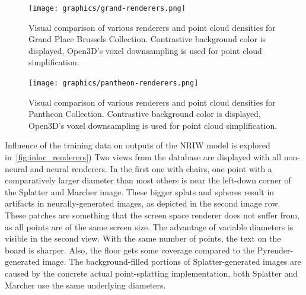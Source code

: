 \begin{figure}
    \centering
    \texttt{[image: graphics/grand-renderers.png]}
    \caption[Visual comparison of various renderers and point cloud
    densities for Grand Place Brussels Collection]{Visual comparison
    of various renderers and point cloud densities for Grand Place Brussels
    Collection. Contrastive background color is displayed, Open3D's
    voxel downsampling is used for point cloud simplification.}
    \label{fig:grand_renderers}
\end{figure}

\begin{figure}
    \centering
    \texttt{[image: graphics/pantheon-renderers.png]}
    \caption[Visual comparison of various renderers and point cloud
    densities for Pantheon Collection]{Visual comparison of various
    renderers and point cloud densities for Pantheon Collection.
    Contrastive background color is displayed, Open3D's voxel downsampling is used
    for point cloud simplification.}
    \label{fig:pantheon_renderers}
\end{figure}

Influence of the training data on outputs of the NRIW model is explored
in~\cref{fig:inloc_renderers}) Two views from the database are displayed
with all non-neural and neural renderers. In the first one with chairs,
one point with a comparatively larger diameter than most others is
near the left-down corner of the Splatter and Marcher image. These bigger splats
and spheres result in artifacts in neurally-generated images, as
depicted in the second image row. These patches are something that the screen space
renderer does not suffer from, as all points are of the same screen size.
The advantage of variable diameters
is visible in the second view. With the same  number of points,
the text on the board is sharper. Also, the floor gets some coverage
compared to the Pyrender-generated image. The background-filled portions of
Splatter-generated images are caused by the concrete actual point-splatting
implementation, both Splatter and Marcher use the same underlying diameters.\\

